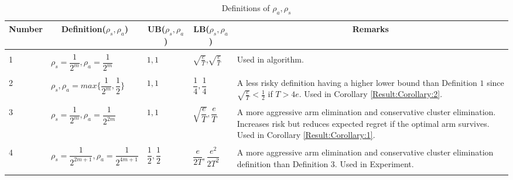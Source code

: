 \begin{table}
\caption{Definitions of $\rho_{a},\rho_{s}$}
\label{App:E:table:1}
\begin{center}
\begin{tabular}{p{1cm}p{5cm}p{1cm}p{1cm}p{6cm}}
\multicolumn{1}{c}{\bf Number} &\multicolumn{1}{c}{\bf Definition($\rho_{s},\rho_{a}$)}  &\multicolumn{1}{c}{\bf UB($\rho_{s},\rho_{a}$)} &\multicolumn{1}{c}{\bf LB($\rho_{s},\rho_{a}$)} &\multicolumn{1}{c}{\bf Remarks} \\
\hline \\
1	&$\rho_{s}=\dfrac{1}{2^{m}},\rho_{a}=\dfrac{1}{2^{m}}$         & $1,1$  &$\sqrt{\frac{e}{T}}$,$\sqrt{\frac{e}{T}}$ & Used in algorithm. \\
\hline\\ 
2	&$\rho_{s},\rho_{a}=max\bigg\lbrace\dfrac{1}{2^{m}},\dfrac{1}{2}\bigg\rbrace$         & $1,1$  &$\dfrac{1}{4},\dfrac{1}{4}$ & A less risky definition having a higher lower bound than Definition $1$ since $\sqrt{\frac{e}{T}}< \frac{1}{2}$ if $T> 4e$. Used in Corollary \ref{Result:Corollary:2}.\\
\hline\\ 
3	&$\rho_{s}=\dfrac{1}{2^{m}},\rho_{a}=\dfrac{1}{2^{2m}}$         & $1,1$  &$\sqrt{\dfrac{e}{T}},\dfrac{e}{T}$ & A more aggressive arm elimination and conservative cluster elimination. Increases risk but reduces expected regret if the optimal arm survives. Used in Corollary \ref{Result:Corollary:1}.\\ 
\hline\\
4	&$\rho_{s}=\dfrac{1}{2^{2m+1}},\rho_{a}=\dfrac{1}{2^{4m+1}}$         & $\dfrac{1}{2},\dfrac{1}{2}$  &$\dfrac{e}{2T},\dfrac{e^{2}}{2T^{2}}$ & A more aggressive arm elimination and conservative cluster elimination definition than Definition $3$. Used in Experiment.\\
\hline\\
\end{tabular}
\end{center}
\end{table}

